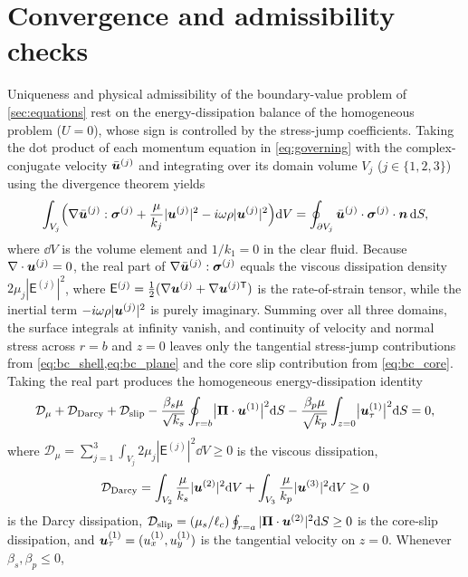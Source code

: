\section{Convergence and admissibility checks}\label{app:checks}
Uniqueness and physical admissibility of the boundary-value problem of \cref{sec:equations} rest on the
energy-dissipation balance of the homogeneous problem ($U=0$), whose sign is controlled by the stress-jump coefficients. Taking the dot product of each momentum equation in
\cref{eq:governing} with the complex-conjugate velocity $\bar{\bm{u}}^{(j)}$ and integrating over its domain volume $V_j$
($j\in\{1,2,3\}$) using the divergence theorem yields
\begin{equation*}
  \int_{V_j}\Bigl(\nabla\bar{\bm{u}}^{(j)}:\bm{\sigma}^{(j)}+\frac{\mu}{k_j}|\bm{u}^{(j)}|^2-i\omega\rho|\bm{u}^{(j)}|^2\Bigr)\mathrm{d} V
  =\oint_{\partial V_j}\bar{\bm{u}}^{(j)}\cdot\bm{\sigma}^{(j)}\cdot\bm{n}\,\mathrm{d} S,
\end{equation*}
where $\dd V$ is the volume element and $1/k_1=0$ in the
clear fluid. Because $\nabla\cdot\bm{u}^{(j)}=0$, the real part of $\nabla\bar{\bm{u}}^{(j)}:\bm{\sigma}^{(j)}$ equals the viscous
dissipation density $2\mu_j|\mathsf E^{(j)}|^2$, where $\mathsf E^{(j)}=\tfrac12(\nabla\bm{u}^{(j)}+\nabla\bm{u}^{(j)\mathsf T})$
is the rate-of-strain tensor, while the inertial term $-i\omega\rho|\bm{u}^{(j)}|^2$ is purely imaginary. Summing over all
three domains, the surface integrals at infinity vanish, and continuity of velocity and normal stress across $r=b$ and
$z=0$ leaves only the tangential stress-jump contributions from \cref{eq:bc_shell,eq:bc_plane} and the core slip
contribution from \cref{eq:bc_core}. Taking the real part produces the homogeneous energy-dissipation identity
\begin{equation}
  \mathcal D_\mu+\mathcal D_{\rm Darcy}+\mathcal D_{\rm slip}
  -\frac{\beta_s\mu}{\sqrt{k_s}}\oint_{r=b}\bigl|\bm\Pi\cdot\bm{u}^{(1)}\bigr|^2\mathrm{d} S
  -\frac{\beta_p\mu}{\sqrt{k_p}}\int_{z=0}\bigl|\bm{u}^{(1)}_\tau\bigr|^2\mathrm{d} S=0,
  \label{eq:energy}
\end{equation}
where $\mathcal D_\mu=\sum_{j=1}^3\int_{V_j}2\mu_j|\mathsf E^{(j)}|^2\dd V\ge0$ is the viscous dissipation,
\begin{equation*}
  \mathcal D_{\rm Darcy}=\int_{V_2}\frac{\mu}{k_s}|\bm{u}^{(2)}|^2\mathrm{d} V+\int_{V_3}\frac{\mu}{k_p}|\bm{u}^{(3)}|^2\mathrm{d} V\ge0
\end{equation*}
is the Darcy dissipation, $\mathcal D_{\rm slip}=(\mu_s/\ell_c)\oint_{r=a}|\bm\Pi\cdot\bm{u}^{(2)}|^2\mathrm{d} S\ge0$ is the core-slip
dissipation, and $\bm{u}^{(1)}_\tau=(u^{(1)}_x,u^{(1)}_y)$ is the tangential velocity on $z=0$. Whenever $\beta_s,\beta_p\le0$,
